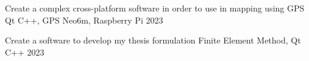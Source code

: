 



\begin{cvhonors}


  \cvhonor
    {Create a complex cross-platform software in order to use in mapping using GPS} %
    {Qt C++, GPS Neo6m, Raspberry Pi} %
    {} %
    {2023} %

\vspace{10pt}
  \cvhonor
    {Create a software to develop my thesis formulation} %
    {Finite Element Method, Qt C++} %
    {} %
    {2023} %

\vspace{10pt}    
    

\end{cvhonors}


    {} %
    {} %
    {} %
    {} %